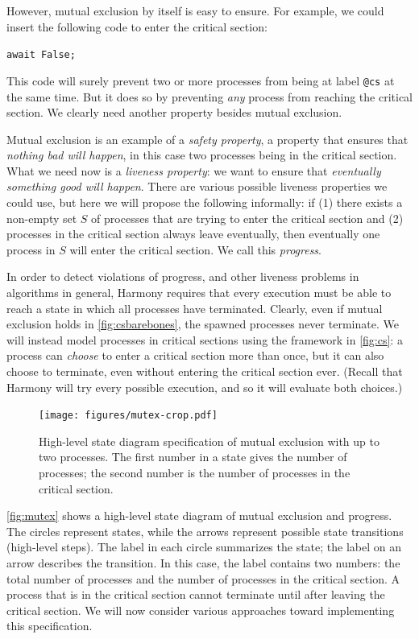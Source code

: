 \documentclass{report}
\newenvironment{code}{
\tcolorbox
}{
\endtcolorbox
}
\begin{document}
However, mutual exclusion by itself is easy to ensure.
For example, we could insert the following code to enter the
critical section:
\begin{code}
\texttt{await False;}
\end{code}
This code will surely prevent two or more processes from being
at label \texttt{@cs} at the same time.
But it does so by preventing \emph{any} process from reaching
the critical section.
We clearly need another property besides mutual exclusion.

Mutual exclusion is an example of a \emph{safety property},
%
a property that ensures that \emph{nothing bad will happen}, in this case
two processes being in the critical section.
What we need now is a \emph{liveness property}:
%
we want to ensure that
\emph{eventually something good will happen}.
There are various possible liveness properties we could use,
but here we will propose the following informally: if
(1) there exists a non-empty
set $S$ of processes that are trying to enter the critical section and
(2) processes in the critical section always leave eventually, then
eventually one process in $S$ will enter the critical section.
We call this \emph{progress}.
%

In order to detect violations of progress, and other liveness problems in
algorithms in general, Harmony requires that every execution must be
able to reach a state in which all processes have terminated.
Clearly, even if mutual exclusion holds in \autoref{fig:csbarebones},
the spawned processes never terminate.  We
will instead model processes in critical sections using the framework in
\autoref{fig:cs}: a process can \emph{choose} to enter a
critical section more than once, but it can also choose to terminate, even
without entering the critical section ever.
(Recall that Harmony will try every possible execution, and so it will evaluate
both choices.)

\begin{figure}
\begin{center}
\texttt{[image: figures/mutex-crop.pdf]}
\end{center}
\caption{High-level state diagram specification of mutual exclusion with up to two processes.
The first number in a state gives the number of processes; the second number is the
number of processes in the critical section.}
\label{fig:mutex}
\end{figure}

\autoref{fig:mutex} shows a high-level state diagram
%
of mutual exclusion and progress.
The circles represent states, while the arrows represent possible state
transitions (high-level steps).  The label in each circle summarizes the state;
the label on an arrow describes the transition.  In this case,
the label contains two numbers: the total number of processes and the number
of processes in the critical section.  A process that is in the critical
section cannot terminate until after leaving the critical section.
We will now consider various approaches toward implementing this
specification.
\end{document}
